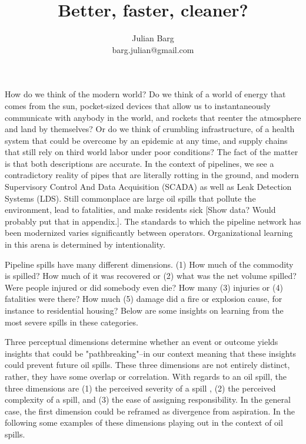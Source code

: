 \documentclass[12pt, man, natbib]{apa6}
\title{Better, faster, cleaner?}
\author{Julian Barg\\barg.julian@gmail.com}
\affiliation{Ivey Business School}
\begin{document}
	
	\maketitle
	
	\singlespacing
	
	\section{}
	How do we think of the modern world? Do we think of a world of energy that comes from the sun, pocket-sized devices that allow us to instantaneously communicate with anybody in the world, and rockets that reenter the atmosphere and land by themselves? Or do we think of crumbling infrastructure, of a health system that could be overcome by an epidemic at any time, and supply chains that still rely on third world labor under poor conditions? The fact of the matter is that both descriptions are accurate. In the context of pipelines, we see a contradictory reality of pipes that are literally rotting in the ground, and modern Supervisory Control And Data Acquisition (SCADA) as well as Leak Detection Systems (LDS). Still commonplace are large oil spills that pollute the environment, lead to fatalities, and make residents sick [Show data? Would probably put that in appendix.]. The standards to which the pipeline network has been modernized varies significantly between operators. Organizational learning in this arena is determined by intentionality.
	
	Pipeline spills have many different dimensions. (1) How much of the commodity is spilled? How much of it was recovered or (2) what was the net volume spilled? Were people injured or did somebody even die? How many (3) injuries or (4) fatalities were there? How much (5) damage did a fire or explosion cause, for instance to residential housing? Below are some insights on learning from the most severe spills in these categories.
	
	Three perceptual dimensions determine whether an event or outcome yields insights that could be "pathbreaking"--in our context meaning that these insights could prevent future oil spills. These three dimensions are not entirely distinct, rather, they have some overlap or correlation. With regards to an oil spill, the three dimensions are (1) the perceived severity of a spill \citep[whether the spill is recognized as a "failure",][]{Madsen2010}, (2) the perceived complexity of a spill, and (3) the ease of assigning responsibility. In the general case, the first dimension could be reframed as divergence from aspiration. In the following some examples of these dimensions playing out in the context of oil spills.
	
\end{document}
